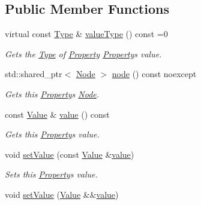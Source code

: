 \subsection*{Public Member Functions}
\begin{DoxyCompactItemize}
\item 
virtual const \hyperlink{classdg_1_1deepcore_1_1_type}{Type} \& \hyperlink{classdg_1_1deepcore_1_1_property_aa424d7706d3f07ab625b3a8abbfcfc7a}{value\+Type} () const =0
\begin{DoxyCompactList}\small\item\em Gets the \hyperlink{classdg_1_1deepcore_1_1_type}{Type} of \hyperlink{classdg_1_1deepcore_1_1_property}{Property} \hyperlink{classdg_1_1deepcore_1_1_property}{Property}\textquotesingle{}s value. \end{DoxyCompactList}\item 
std\+::shared\+\_\+ptr$<$ \hyperlink{classdg_1_1deepcore_1_1_node}{Node} $>$ \hyperlink{classdg_1_1deepcore_1_1_property_af7d9778227ea891e99d70b3eefe56b47}{node} () const noexcept
\begin{DoxyCompactList}\small\item\em Gets this \hyperlink{classdg_1_1deepcore_1_1_property}{Property}\textquotesingle{}s \hyperlink{classdg_1_1deepcore_1_1_node}{Node}. \end{DoxyCompactList}\item 
const \hyperlink{classdg_1_1deepcore_1_1_value}{Value} \& \hyperlink{classdg_1_1deepcore_1_1_property_aeaa6e131afc1efd01f0a7b313e832d75}{value} () const 
\begin{DoxyCompactList}\small\item\em Gets this \hyperlink{classdg_1_1deepcore_1_1_property}{Property}\textquotesingle{}s value. \end{DoxyCompactList}\item 
void \hyperlink{classdg_1_1deepcore_1_1_property_a472ce69710641cd66f4620f73bc0b6bc}{set\+Value} (const \hyperlink{classdg_1_1deepcore_1_1_value}{Value} \&\hyperlink{classdg_1_1deepcore_1_1_property_aeaa6e131afc1efd01f0a7b313e832d75}{value})
\begin{DoxyCompactList}\small\item\em Sets this \hyperlink{classdg_1_1deepcore_1_1_property}{Property}\textquotesingle{}s value. \end{DoxyCompactList}\item 
void \hyperlink{classdg_1_1deepcore_1_1_property_a2e861754ec53ee22e3d95d88ad6a963c}{set\+Value} (\hyperlink{classdg_1_1deepcore_1_1_value}{Value} \&\&\hyperlink{classdg_1_1deepcore_1_1_property_aeaa6e131afc1efd01f0a7b313e832d75}{value})

\end{DoxyCompactItemize}
